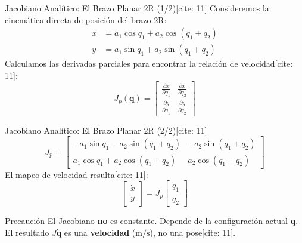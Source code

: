 \documentclass[aspectratio=169, xcolor={table,xcdraw}]{beamer}
\begin{document}
\begin{frame}{Jacobiano Analítico: El Brazo Planar 2R (1/2)[cite: 11]}
    Consideremos la cinemática directa de posición del brazo 2R:
    \begin{align*}
        x &= a_1\cos q_1 + a_2\cos(q_1+q_2) \\
        y &= a_1\sin q_1 + a_2\sin(q_1+q_2)
    \end{align*}
    Calculamos las derivadas parciales para encontrar la relación de velocidad[cite: 11]:
    \begin{equation*}
        J_p(\mathbf{q}) = \begin{bmatrix} 
            \frac{\partial x}{\partial q_1} & \frac{\partial x}{\partial q_2} \\[0.2cm]
            \frac{\partial y}{\partial q_1} & \frac{\partial y}{\partial q_2} 
        \end{bmatrix}
    \end{equation*}
\end{frame}

\begin{frame}{Jacobiano Analítico: El Brazo Planar 2R (2/2)[cite: 11]}
    \begin{equation*}
        \boxed{
        J_p =
        \begin{bmatrix}
        -a_1\sin q_1-a_2\sin(q_1+q_2) & -a_2\sin(q_1+q_2)\\
        a_1\cos q_1+a_2\cos(q_1+q_2) & a_2\cos(q_1+q_2)
        \end{bmatrix}
        }
    \end{equation*}
    \vfill
    El mapeo de velocidad resulta[cite: 11]:
    \begin{equation*}
        \begin{bmatrix}\dot x\\\dot y\end{bmatrix} = J_p \begin{bmatrix}\dot q_1\\\dot q_2\end{bmatrix}
    \end{equation*}
    \vfill
    \begin{alertblock}{Precaución}
        El Jacobiano \textbf{no} es constante. Depende de la configuración actual $\mathbf{q}$. El resultado $J\dot{\mathbf{q}}$ es una \textbf{velocidad} ($\mathrm{m/s}$), no una pose[cite: 11].
    \end{alertblock}
\end{frame}
\end{document}
